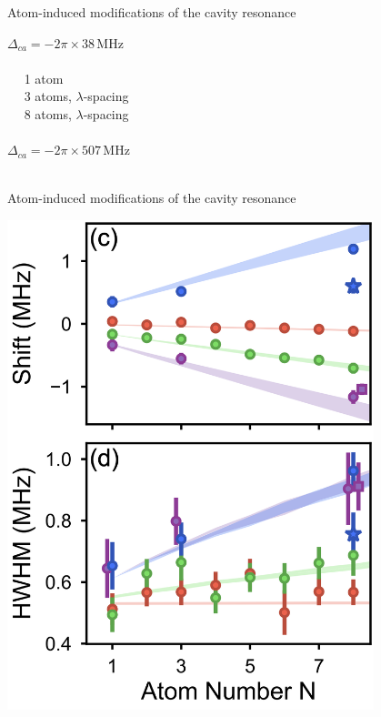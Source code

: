 \documentclass{beamer}
\begin{document}
\begin{frame}{Atom-induced modifications of the cavity resonance}
\begin{minipage}{0.61\textwidth}
\begin{minipage}{0.47\textwidth}
		\end{minipage}
		\hspace{-1em}
		\begin{minipage}{0.42\textwidth}
			{\footnotesize$\Delta_{ca} = -2\pi\times38\,$MHz\\~\\
			\textcolor[rgb]{0.376, 0.376, 0.376}{~ ~1 atom}\\
			\textcolor[rgb]{0.725, 0.612, 0.243}{~ ~3 atoms, $\lambda$-spacing}\\
			\textcolor[rgb]{0.263, 0.588, 0.588}{~ ~8 atoms, $\lambda$-spacing}\\~\\
			\footnotesize$\Delta_{ca} = -2\pi\times507\,$MHz\\~}
		\end{minipage}
	\end{minipage}
\end{frame}

\begin{frame}{Atom-induced modifications of the cavity resonance}
	\begin{minipage}{0.5\textwidth}
		\centering
		\includegraphics[width=0.8\textwidth]{Figure_4c.png}
	\end{minipage}
\end{frame}
\end{document}
